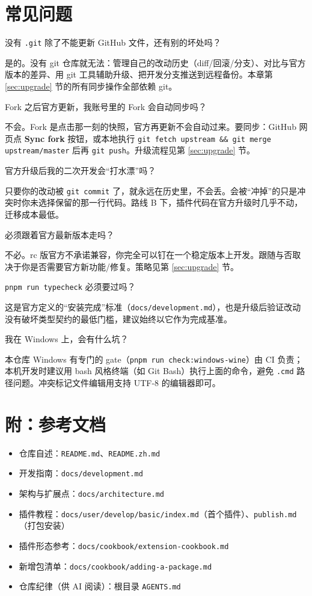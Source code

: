 \documentclass[11pt]{ctexart}
\newcommand{\code}[1]{\texttt{\small #1}}
\begin{document}
\section{常见问题}

\begin{description}[itemsep=3pt]
  \item[问] 没有 \code{.git} 除了不能更新 GitHub 文件，还有别的坏处吗？
  \item[答] 是的。没有 git 仓库就无法：管理自己的改动历史（diff/回滚/分支）、对比与官方版本的差异、用 git 工具辅助升级、把开发分支推送到远程备份。本章第 \ref{sec:upgrade} 节的所有同步操作全部依赖 git。
  \item[问] Fork 之后官方更新，我账号里的 Fork 会自动同步吗？
  \item[答] 不会。Fork 是点击那一刻的快照，官方再更新不会自动过来。要同步：GitHub 网页点 \textbf{Sync fork} 按钮，或本地执行 \code{git fetch upstream \&\& git merge upstream/master} 后再 \code{git push}。升级流程见第 \ref{sec:upgrade} 节。
  \item[问] 官方升级后我的二次开发会“打水漂”吗？
  \item[答] 只要你的改动被 \code{git commit} 了，就永远在历史里，不会丢。会被“冲掉”的只是冲突时你未选择保留的那一行代码。路线 B 下，插件代码在官方升级时几乎不动，迁移成本最低。
  \item[问] 必须跟着官方最新版本走吗？
  \item[答] 不必。rc 版官方不承诺兼容，你完全可以钉在一个稳定版本上开发。跟随与否取决于你是否需要官方新功能/修复。策略见第 \ref{sec:upgrade} 节。
  \item[问] \code{pnpm run typecheck} 必须要过吗？
  \item[答] 这是官方定义的“安装完成”标准（\code{docs/development.md}），也是升级后验证改动没有破坏类型契约的最低门槛，建议始终以它作为完成基准。
  \item[问] 我在 Windows 上，会有什么坑？
  \item[答] 本仓库 Windows 有专门的 gate（\code{pnpm run check:windows-wine}）由 CI 负责；本机开发时建议用 bash 风格终端（如 Git Bash）执行上面的命令，避免 \code{.cmd} 路径问题。冲突标记文件编辑用支持 UTF-8 的编辑器即可。
\end{description}

\section*{附：参考文档}

\begin{itemize}[itemsep=1pt]
  \item 仓库自述：\code{README.md}、\code{README.zh.md}
  \item 开发指南：\code{docs/development.md}
  \item 架构与扩展点：\code{docs/architecture.md}
  \item 插件教程：\code{docs/user/develop/basic/index.md}（首个插件）、\code{publish.md}（打包安装）
  \item 插件形态参考：\code{docs/cookbook/extension-cookbook.md}
  \item 新增包清单：\code{docs/cookbook/adding-a-package.md}
  \item 仓库纪律（供 AI 阅读）：根目录 \code{AGENTS.md}
\end{itemize}
\end{document}
